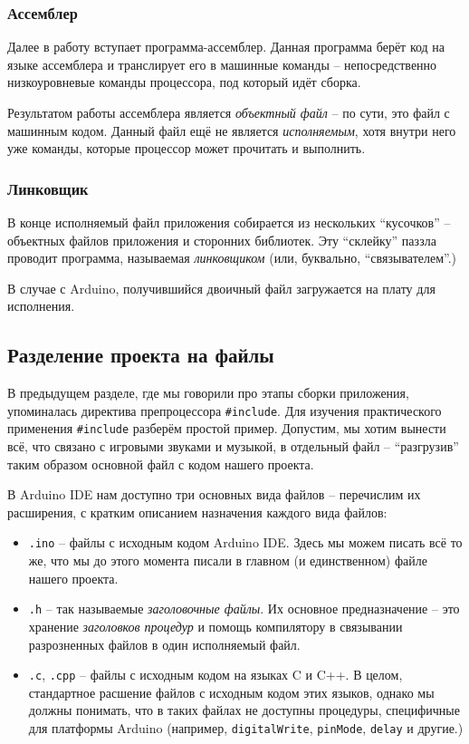 \documentclass[../sparc.tex]{subfiles}
\begin{document}
\subsubsection{Ассемблер}

Далее в работу вступает программа-ассемблер.  Данная программа берёт код на
языке ассемблера и транслирует его в машинные команды -- непосредственно
низкоуровневые команды процессора, под который идёт сборка.

Результатом работы ассемблера является \emph{объектный файл} -- по сути, это файл
с машинным кодом.  Данный файл ещё не является \emph{исполняемым}, хотя внутри
него уже команды, которые процессор может прочитать и выполнить.

\subsubsection{Линковщик}

В конце исполняемый файл приложения собирается из нескольких ``кусочков'' --
объектных файлов приложения и сторонних библиотек.  Эту ``склейку'' паззла
проводит программа, называемая \emph{линковщиком} (или, буквально,
``связывателем''.)

В случае с Arduino, получившийся двоичный файл загружается на плату для
исполнения.

\subsection{Разделение проекта на файлы}
\label{subsection:multi-file-applications}

В предыдущем разделе, где мы говорили про этапы сборки приложения, упоминалась
директива препроцессора \texttt{#include}.  Для изучения практического
применения \texttt{#include} разберём простой пример.  Допустим, мы
хотим вынести всё, что связано с игровыми звуками и музыкой, в отдельный файл --
``разгрузив'' таким образом основной файл с кодом нашего проекта.

В Arduino IDE нам доступно три основных вида файлов -- перечислим их расширения,
с кратким описанием назначения каждого вида файлов:
\begin{itemize}
\item \texttt{.ino} -- файлы с исходным кодом Arduino IDE.  Здесь мы можем писать
  всё то же, что мы до этого момента писали в главном (и единственном) файле
  нашего проекта.
\item \texttt{.h} -- так называемые \emph{заголовочные файлы}.  Их основное
  предназначение -- это хранение \emph{заголовков процедур} и помощь компилятору
  в связывании разрозненных файлов в один исполняемый файл.
\item \texttt{.с}, \texttt{.cpp} -- файлы с исходным кодом на языках C и C++.  В
  целом, стандартное расшение файлов с исходным кодом этих языков, однако мы
  должны понимать, что в таких файлах не доступны процедуры, специфичные для
  платформы Arduino (например, \texttt{digitalWrite},
  \texttt{pinMode}, \texttt{delay} и другие.)
\end{itemize}
\end{document}
